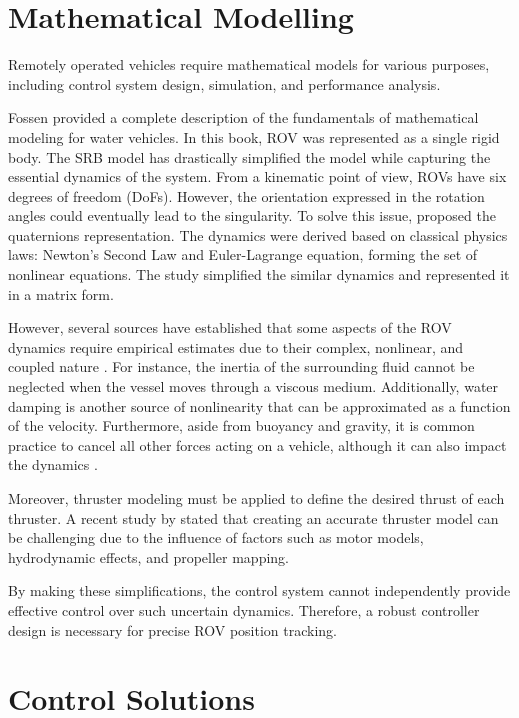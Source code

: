 \section{Mathematical Modelling}

Remotely operated vehicles require mathematical models for various purposes, including control 
system design, simulation, and performance analysis.

Fossen \cite{fossen:guidance} provided a complete description of the fundamentals of mathematical modeling for water 
vehicles. In this book, ROV was represented as a 
single rigid body. The SRB model has drastically simplified the model while capturing the essential 
dynamics of the system. From a kinematic 
point of view, ROVs have six degrees of freedom (DoFs). However, the orientation expressed 
in the rotation angles could eventually lead to the singularity. To solve this issue, 
\cite{quat_smc} proposed the quaternions representation. The dynamics were derived based on classical 
physics laws: Newton’s Second Law and Euler-Lagrange equation, forming the set of nonlinear equations.
The study \cite{identification} simplified the similar dynamics and represented it in a matrix form.

However, several sources have established that some aspects of the ROV dynamics require empirical 
estimates due to their complex, nonlinear, and coupled nature \cite{fossen:guidance, bluerov}. For instance, the inertia 
of the surrounding fluid cannot be neglected when the vessel moves through a viscous medium. Additionally, water damping is another source of nonlinearity that 
can be approximated as a function of the velocity. Furthermore, aside from buoyancy and 
gravity, it is common practice to cancel all other forces acting on a vehicle, although it can also impact the dynamics \cite{bluerov}.

Moreover, thruster modeling must be applied to define the desired thrust of each thruster. A recent 
study by \cite{bluerov} stated that creating an accurate thruster model can be challenging due to the 
influence of factors such as motor models, hydrodynamic effects, and propeller mapping.

By making these simplifications, the control system cannot independently provide effective control 
over such uncertain dynamics. Therefore, a robust controller design is necessary for precise ROV 
position tracking.

\section{Control Solutions}

